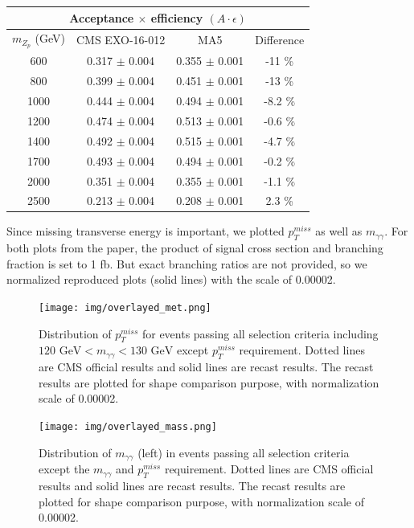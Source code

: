 \documentclass[12pt,A4paper]{article}
\begin{document}
\vskip 10pt


\begin{center}
\begin{tabular}{c c c c}
\hline
\multicolumn{4}{c}{Acceptance $\times$ efficiency $(A \cdot \epsilon)$}\\
\hline
$m_{Z_p}$ (GeV)& CMS EXO-16-012& MA5& Difference\\
\hline
600& 0.317 $\pm$ 0.004& 0.355 $\pm$ 0.001& -11 \%\\%
800& 0.399 $\pm$ 0.004& 0.451 $\pm$ 0.001& -13 \%\\%
1000& 0.444 $\pm$ 0.004& 0.494 $\pm$ 0.001& -8.2 \%\\%
1200& 0.474 $\pm$ 0.004& 0.513 $\pm$ 0.001& -0.6 \%\\%
1400& 0.492 $\pm$ 0.004& 0.515  $\pm$ 0.001& -4.7 \%\\%
1700& 0.493 $\pm$ 0.004& 0.494 $\pm$ 0.001& -0.2 \%\\%
2000& 0.351 $\pm$ 0.004& 0.355 $\pm$ 0.001& -1.1 \%\\%
2500& 0.213 $\pm$ 0.004& 0.208 $\pm$ 0.001& 2.3 \%\\%
\hline
\end{tabular}
\end{center}

Since missing transverse energy is important, we plotted $ p_T^{miss}$ as well as $m_{\gamma\gamma}$. For both plots from the paper, the product of signal cross section and branching fraction is set to 1 fb. But exact branching ratios are not provided, so we normalized reproduced plots (solid lines) with the scale of 0.00002.

\begin{figure}[h!]
\centering
	\texttt{[image: img/overlayed\_met.png]}
\caption{Distribution of $p_T^{miss}$ for events passing all selection criteria including $120 \textrm{ GeV} < m_{\gamma\gamma} < 130 \textrm{ GeV}$ except $p_T^{miss}$ requirement. Dotted lines are CMS official results\cite{ref:paper} and solid lines are recast results. The recast results are plotted for shape comparison purpose, with normalization scale of 0.00002.}
\end{figure}

\begin{figure}[h!]
\centering
  \centering
  \texttt{[image: img/overlayed\_mass.png]}
\caption{Distribution of $m_{\gamma\gamma}$ (left)\cite{ref:paper} in events passing all selection criteria except the $m_{\gamma\gamma}$ and $p_T^{miss}$ requirement. Dotted lines are CMS official results\cite{ref:paper} and solid lines are recast results. The recast results are plotted for shape comparison purpose, with normalization scale of 0.00002.}
\end{figure}
\end{document}
